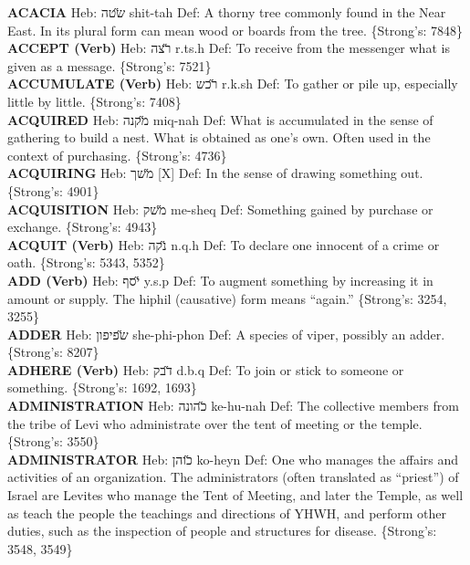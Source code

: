 {\textbf{ACACIA} Heb: {\large\H שטה} shit-tah Def: A thorny tree commonly found in the Near East. In its plural form can mean wood or boards from the tree. \{Strong's: 7848\}\hfill{}\\

\textbf{ACCEPT (Verb)} Heb: {\large\H רצה} r.ts.h Def: To receive from the messenger what is given as a message. \{Strong's: 7521\}\hfill{}\\

\textbf{ACCUMULATE (Verb)} Heb: {\large\H רכש} r.k.sh Def: To gather or pile up, especially little by little. \{Strong's: 7408\}\hfill{}\\

\textbf{ACQUIRED} Heb: {\large\H מקנה} miq-nah Def: What is accumulated in the sense of gathering to build a nest. What is obtained as one's own. Often used in the context of purchasing. \{Strong's: 4736\}\hfill{}\\

\textbf{ACQUIRING} Heb: {\large\H משך} {[}X{]} Def: In the sense of drawing something out. \{Strong's: 4901\}\hfill{}\\

\textbf{ACQUISITION} Heb: {\large\H משק} me-sheq Def: Something gained by purchase or exchange. \{Strong's: 4943\}\hfill{}\\

\textbf{ACQUIT (Verb)} Heb: {\large\H נקה} n.q.h Def: To declare one innocent of a crime or oath. \{Strong's: 5343, 5352\}\hfill{}\\

\textbf{ADD (Verb)} Heb: {\large\H יסף} y.s.p Def: To augment something by increasing it in amount or supply. The hiphil (causative) form means ``again.'' \{Strong's: 3254, 3255\}\hfill{}\\

\textbf{ADDER} Heb: {\large\H שפיפון} she-phi-phon Def: A species of viper, possibly an adder. \{Strong's: 8207\}\hfill{}\\

\textbf{ADHERE (Verb)} Heb: {\large\H דבק} d.b.q Def: To join or stick to someone or something. \{Strong's: 1692, 1693\}\hfill{}\\

\textbf{ADMINISTRATION} Heb: {\large\H כהונה} ke-hu-nah Def: The collective members from the tribe of Levi who administrate over the tent of meeting or the temple. \{Strong's: 3550\}\hfill{}\\

\textbf{ADMINISTRATOR} Heb: {\large\H כוהן} ko-heyn Def: One who manages the affairs and activities of an organization. The administrators (often translated as ``priest'') of Israel are Levites who manage the Tent of Meeting, and later the Temple, as well as teach the people the teachings and directions of YHWH, and perform other duties, such as the inspection of people and structures for disease. \{Strong's: 3548, 3549\}\hfill{}\\

}
